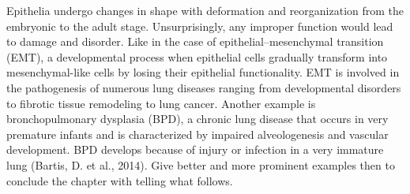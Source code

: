 Epithelia undergo changes in shape with deformation and reorganization
from the embryonic to the adult stage. Unsurprisingly, any improper
function would lead to damage and disorder. Like in the case of
epithelial--mesenchymal transition (EMT), a developmental process when
epithelial cells gradually transform into mesenchymal-like cells by
losing their epithelial functionality. EMT is involved in the
pathogenesis of numerous lung diseases ranging from developmental
disorders to fibrotic tissue remodeling to lung cancer. Another example
is bronchopulmonary dysplasia (BPD), a chronic lung disease that occurs
in very premature infants and is characterized by impaired
alveologenesis and vascular development. BPD develops because of injury
or infection in a very immature lung (Bartis, D. et al., 2014). Give
better and more prominent examples then to conclude the chapter with
telling what follows.
